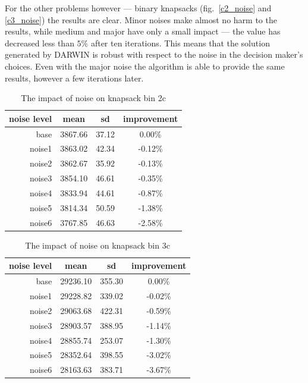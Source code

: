 For the other problems however --- binary knapsacks (fig.~\ref{c2_noise} and
\ref{c3_noise}) the results are clear. Minor noises make almost no harm to the
results, while medium and major have only a small impact --- the value has
decreased less than $5\%$ after ten iterations. This means that the solution
generated by DARWIN is robust with respect to the noise in the decision
maker's choices. Even with the major noise the algorithm is able to provide
the same results, however a few iterations later.

\begin{table}[h]
  \centering
  \begin{tabular}{r c c c}
    \hline
    noise level & mean & sd & improvement\\
    \hline
    \hline
    base & 3867.66 & 37.12 & 0.00\% \\
    noise1 & 3863.02 & 42.34 & -0.12\% \\
    noise2 & 3862.67 & 35.92 & -0.13\% \\
    noise3 & 3854.10 & 46.61 & -0.35\% \\
    noise4 & 3833.94 & 44.61 & -0.87\% \\
    noise5 & 3814.34 & 50.59 & -1.38\% \\
    noise6 & 3767.85 & 46.63 & -2.58\% \\
    \hline
  \end{tabular}
  \caption{The impact of noise on knapsack bin 2c}
  \label{t:noise1}
\end{table}

\begin{table}[h]
  \centering
  \begin{tabular}{r c c c}
    \hline
    noise level & mean & sd & improvement\\
    \hline
    \hline
    base & 29236.10 & 355.30 & 0.00\% \\
    noise1 & 29228.82 & 339.02 & -0.02\% \\
    noise2 & 29063.68 & 422.31 & -0.59\% \\
    noise3 & 28903.57 & 388.95 & -1.14\% \\
    noise4 & 28855.74 & 253.07 & -1.30\% \\
    noise5 & 28352.64 & 398.55 & -3.02\% \\
    noise6 & 28163.63 & 383.71 & -3.67\% \\
    \hline
  \end{tabular}
  \caption{The impact of noise on knapsack bin 3c}
  \label{t:noise2}
\end{table}

